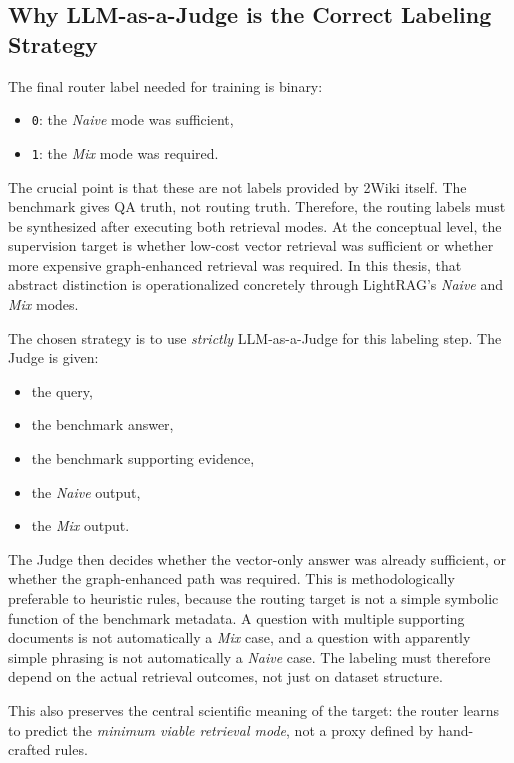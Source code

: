 \documentclass[11pt, a4paper]{article}
\begin{document}
\subsection{Why LLM-as-a-Judge is the Correct Labeling Strategy}

The final router label needed for training is binary:
\begin{itemize}[label=--]
    \item \texttt{0}: the \emph{Naive} mode was sufficient,
    \item \texttt{1}: the \emph{Mix} mode was required.
\end{itemize}

The crucial point is that these are not labels provided by 2Wiki itself. The benchmark gives QA truth, not routing truth. Therefore, the routing labels must be synthesized after executing both retrieval modes. At the conceptual level, the supervision target is whether low-cost vector retrieval was sufficient or whether more expensive graph-enhanced retrieval was required. In this thesis, that abstract distinction is operationalized concretely through LightRAG's \emph{Naive} and \emph{Mix} modes.

The chosen strategy is to use \emph{strictly} LLM-as-a-Judge for this labeling step. The Judge is given:
\begin{itemize}[label=--]
    \item the query,
    \item the benchmark answer,
    \item the benchmark supporting evidence,
    \item the \emph{Naive} output,
    \item the \emph{Mix} output.
\end{itemize}

The Judge then decides whether the vector-only answer was already sufficient, or whether the graph-enhanced path was required. This is methodologically preferable to heuristic rules, because the routing target is not a simple symbolic function of the benchmark metadata. A question with multiple supporting documents is not automatically a \emph{Mix} case, and a question with apparently simple phrasing is not automatically a \emph{Naive} case. The labeling must therefore depend on the actual retrieval outcomes, not just on dataset structure.

This also preserves the central scientific meaning of the target: the router learns to predict the \emph{minimum viable retrieval mode}, not a proxy defined by hand-crafted rules.
\end{document}
